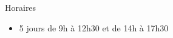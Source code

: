 \begin{frame}{Horaires}
  \begin{itemize}
  \item 5 jours de 9h à 12h30 et de 14h à 17h30 
  \end{itemize}
\end{frame}
